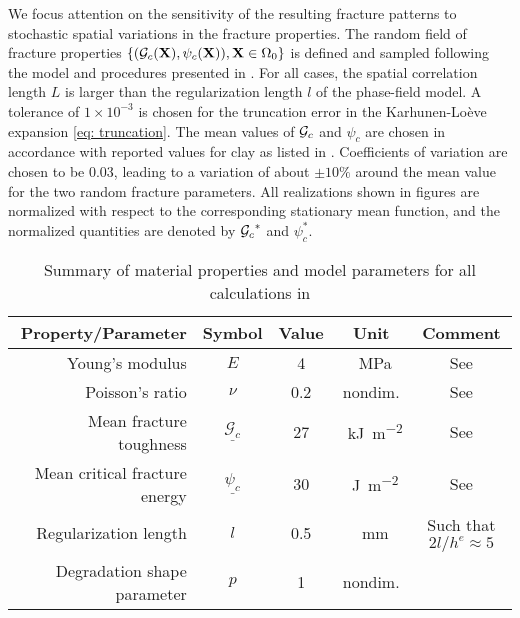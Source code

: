We focus attention on the sensitivity of the resulting fracture patterns to stochastic spatial variations in the fracture properties. The random field of fracture properties $\{({\mathcal{G}_c}(\textbf{X}),\psi_c(\textbf{X})), \textbf{X} \in \Omega_0\}$ is defined and sampled following the model and procedures presented in . For all cases, the spatial correlation length $L$ is larger than the regularization length $l$ of the phase-field model. A tolerance of $1 \times 10^{-3}$ is chosen for the truncation error in the Karhunen-Lo\`{e}ve expansion \eqref{eq: truncation}.
The mean values of ${\mathcal{G}_c}$ and $\psi_c$ are chosen in accordance with reported values for clay as listed in . Coefficients of variation are chosen to be $0.03$, leading to a variation of about $\pm 10\%$ around the mean value for the two random fracture parameters. All realizations shown in figures are normalized with respect to the corresponding stationary mean function, and the normalized quantities are denoted by ${\mathcal{G}_c}^*$ and $\psi_c^*$.

\begin{table}[htb!]
  \centering
  \caption{Summary of material properties and model parameters for all calculations in }
  \begin{tabular}{r c c c c}
    \toprule
    Property/Parameter            & Symbol                      & Value & Unit                                & Comment                                       \\
    \midrule
    Young's modulus               & $E$                         & 4     & \SI{}{\mega\pascal}                 & See \cite{obrzud2010hardening, Rodriguez2006} \\
    Poisson's ratio               & $\nu$                       & 0.2   & nondim.                             & See \cite{obrzud2010hardening, Rodriguez2006} \\
    Mean fracture toughness       & $\underline{\mathcal{G}_c}$ & 27    & \SI{}{\kilo\joule\per\square\meter} & See \cite{ramsaroop2010fracture}              \\[5pt]
    Mean critical fracture energy & $\underline{\psi_c}$        & 30    & \SI{}{\joule\per\square\meter}      & See \cite{ramsaroop2010fracture}              \\[5pt]
    Regularization length         & $l$                         & 0.5   & \SI{}{\milli\meter}                 & Such that $2l/h^e \approx 5$                  \\
    Degradation shape parameter   & $p$                         & 1     & nondim.                             &                                               \\
    \bottomrule
  \end{tabular}
  \label{tab: clay}
\end{table}

